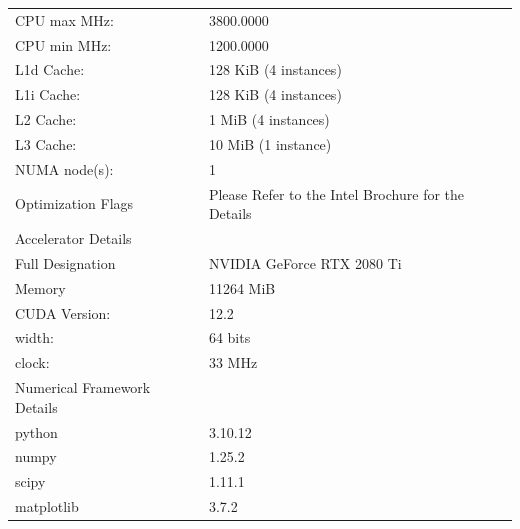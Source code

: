 {\begin{table}
\begin{tabular}{||l l||}
     CPU max MHz:                 & 3800.0000 	                                         	  \\
     CPU min MHz:                 & 1200.0000                                         	  	\\
     L1d Cache:                   & 128 KiB (4 instances)                           	    	\\
     L1i Cache:                   & 128 KiB (4 instances) 	 	                              \\
     L2 Cache:                    & 1 MiB (4 instances) 	                                 	\\
     L3 Cache:                    & 10 MiB (1 instance) 	 	                                \\
     NUMA node(s):                & 1                                               	 	    \\
     Optimization Flags           & Please Refer to the Intel Brochure for the Details  		\\[1ex] 
     \hline
     \hline
     Accelerator Details 			    &  					                                            	\\[0.5ex] 
     \hline\hline
     Full Designation 	    			& NVIDIA GeForce RTX 2080 Ti 	                            \\ 
     Memory   	              		& 11264 MiB 	                                           	\\
     CUDA Version:                & 12.2  	                                               	\\
     width:                       & 64 bits                                                 \\
     clock:                       & 33 MHz 	                                                \\[1ex] 
     \hline
     \hline
     Numerical Framework Details	&  				                                            		\\[0.5ex] 
     \hline\hline
     python                       & 3.10.12                                                 \\
     numpy                        & 1.25.2  		                                            \\
     scipy                        & 1.11.1  		                                            \\
     matplotlib                   & 3.7.2   		                                            \\

\end{tabular}
\end{table}}
